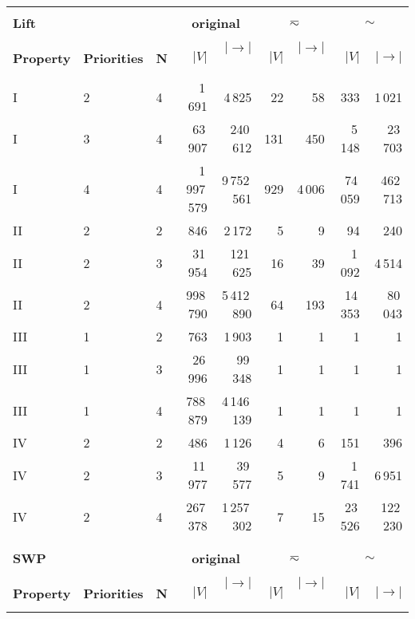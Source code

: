\documentclass[a4paper]{llncs}
\renewcommand{\sb}{\sim}
\newcommand{\stut}{\eqsim}\newcommand{\semistut}{\sim_{\mathrm{semi-st}}}
\begin{document}
\begin{table}[!ht]
\begin{tabular}{lll||rr|rr|rr}
\\
\\
\textbf{Lift} & & &
\multicolumn{2}{c}{\textbf{original}} & \multicolumn{2}{c}{$\stut$} & \multicolumn{2}{c}{$\sb$} \\
\hline
\hline
& & & \\
\textbf{Property} & \textbf{Priorities} & \textbf{N} &
\textbf{$|V|$} & \textbf{$|{\to}|$~} & \textbf{$|V|$} & \textbf{$|{\to}|$~} & \textbf{$|V|$} & \textbf{$|{\to}|$} \\
\hline 
I & 2 & 4 & 1\,691 & 4\,825 & 22 & 58 & 333 & 1\,021\\ \hline 
I & 3 & 4 & 63\,907 & 240\,612 & 131 & 450 & 5\,148 & 23\,703 \\ \hline 
I & 4 & 4 & 1\,997\,579 & 9\,752\,561 & 929 & 4\,006 & 74\,059 & 462\,713 \\ \hline
II & 2 & 2 & 846 & 2\,172 & 5 & 9 & 94 & 240 \\ \hline 
II & 2 & 3 & 31\,954 & 121\,625 & 16 & 39 & 1\,092 & 4\,514 \\ \hline 
II & 2 & 4 & 998\,790 & 5\,412\,890 & 64 & 193 & 14\,353 & 80\,043 \\ \hline 
III & 1 & 2 & 763 & 1\,903 & 1 & 1 & 1 & 1 \\ \hline 
III & 1 & 3 & 26\,996 & 99\,348 & 1 & 1 & 1 & 1 \\ \hline 
III & 1 & 4 & 788\,879 & 4\,146\,139 & 1 & 1 & 1 & 1 \\ \hline 
IV & 2 & 2 & 486 & 1\,126 & 4 & 6 & 151 & 396 \\ \hline 
IV & 2 & 3 & 11\,977 & 39\,577 & 5 & 9 & 1\,741 & 6\,951 \\ \hline 
IV & 2 & 4 & 267\,378 & 1\,257\,302 & 7 & 15 & 23\,526 & 122\,230 \\ \hline 


\\
\\
\textbf{SWP} & & &
\multicolumn{2}{c}{\textbf{original}} & \multicolumn{2}{c}{$\stut$} & \multicolumn{2}{c}{$\sb$} \\
\hline
\hline
& & & \\
\textbf{Property} & \textbf{Priorities} & \textbf{N} &
\textbf{$|V|$} & \textbf{$|{\to}|$~} & \textbf{$|V|$} & \textbf{$|{\to}|$~} & \textbf{$|V|$} & \textbf{$|{\to}|$} \\
\hline 


\end{tabular}
\end{table}
\end{document}
